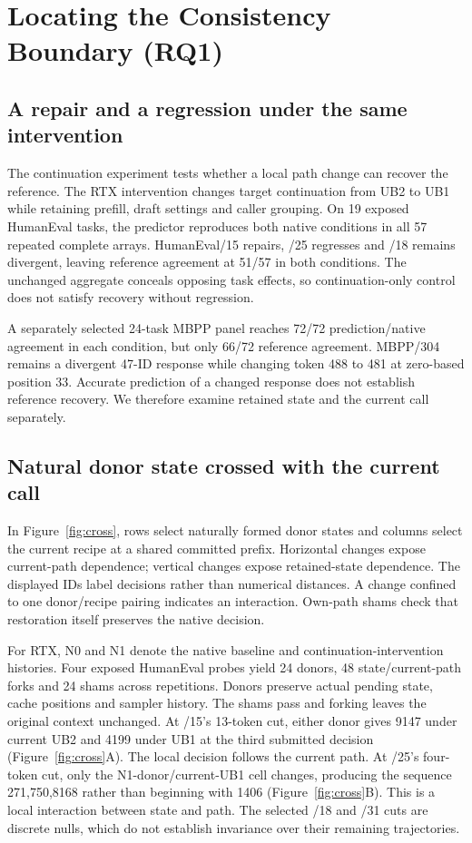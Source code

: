 \section{Locating the Consistency Boundary (RQ1)}
\label{sec:diagnosis}
\subsection{A repair and a regression under the same intervention}
The continuation experiment tests whether a local path change can recover the reference. The RTX intervention changes target continuation from UB2 to UB1 while retaining prefill, draft settings and caller grouping. On 19 exposed HumanEval tasks, the predictor reproduces both native conditions in all 57 repeated complete arrays. HumanEval/15 repairs, /25 regresses and /18 remains divergent, leaving reference agreement at 51/57 in both conditions. The unchanged aggregate conceals opposing task effects, so continuation-only control does not satisfy recovery without regression.

A separately selected 24-task MBPP panel reaches 72/72 prediction/native agreement in each condition, but only 66/72 reference agreement. MBPP/304 remains a divergent 47-ID response while changing token 488 to 481 at zero-based position 33. Accurate prediction of a changed response does not establish reference recovery. We therefore examine retained state and the current call separately.

\subsection{Natural donor state crossed with the current call}
In Figure~\ref{fig:cross}, rows select naturally formed donor states and columns select the current recipe at a shared committed prefix. Horizontal changes expose current-path dependence; vertical changes expose retained-state dependence. The displayed IDs label decisions rather than numerical distances. A change confined to one donor/recipe pairing indicates an interaction. Own-path shams check that restoration itself preserves the native decision.

For RTX, N0 and N1 denote the native baseline and continuation-intervention histories. Four exposed HumanEval probes yield 24 donors, 48 state/current-path forks and 24 shams across repetitions. Donors preserve actual pending state, cache positions and sampler history. The shams pass and forking leaves the original context unchanged. At /15's 13-token cut, either donor gives 9147 under current UB2 and 4199 under UB1 at the third submitted decision (Figure~\ref{fig:cross}A). The local decision follows the current path. At /25's four-token cut, only the N1-donor/current-UB1 cell changes, producing the sequence 271,750,8168 rather than beginning with 1406 (Figure~\ref{fig:cross}B). This is a local interaction between state and path. The selected /18 and /31 cuts are discrete nulls, which do not establish invariance over their remaining trajectories.

